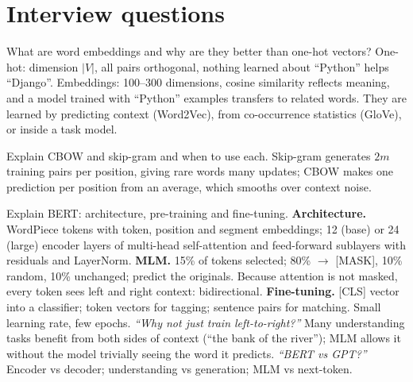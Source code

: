 \section{Interview questions}

\begin{qa}{ What are word embeddings and why are they better than one-hot vectors?}
\why One-hot: dimension $|V|$, all pairs orthogonal, nothing learned about ``Python'' helps ``Django''. Embeddings: 100--300 dimensions, cosine similarity
reflects meaning, and a model trained with ``Python'' examples transfers to related words. They are learned by predicting context (Word2Vec), from
co-occurrence statistics (GloVe), or inside a task model.
\end{qa}

\begin{qa}{ Explain CBOW and skip-gram and when to use each.}
\why Skip-gram generates $2m$ training pairs per position, giving rare words many updates; CBOW makes one prediction per position from an average, which
smooths over context noise.
\end{qa}

\begin{qa}{ Explain BERT: architecture, pre-training and fine-tuning.}
\why
\textbf{Architecture.} WordPiece tokens with token, position and segment embeddings; 12 (base) or 24 (large) encoder layers of multi-head self-attention and
feed-forward sublayers with residuals and LayerNorm.
\textbf{MLM.} 15\% of tokens selected; 80\% $\to$ [MASK], 10\% random, 10\% unchanged; predict the originals. Because attention is not masked, every token
sees left and right context: bidirectional.
\textbf{Fine-tuning.} [CLS] vector into a classifier; token vectors for tagging; sentence pairs for matching. Small learning rate, few epochs.
\pushes \emph{``Why not just train left-to-right?''} Many understanding tasks benefit from both sides of context (``the bank of the river''); MLM allows it
without the model trivially seeing the word it predicts. \emph{``BERT vs GPT?''} Encoder vs decoder; understanding vs generation; MLM vs next-token.
\end{qa}


